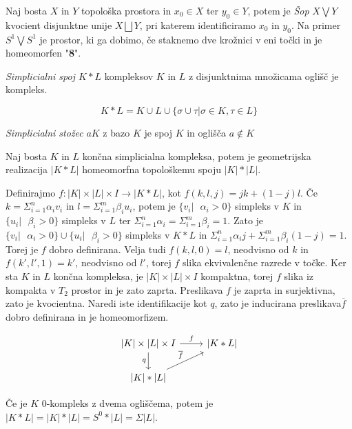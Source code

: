 \documentclass[mat1]{fmfdelo}
\begin{document}
Naj bosta $X$ in $Y$ topološka prostora in $x_0\in X$ ter $y_0\in Y$, potem je 
\textit{Šop} $X\bigvee Y$ kvocient disjunktne unije $X\bigsqcup Y$, pri
 katerem identificiramo $x_0$ in $y_0$. Na primer $S^1\bigvee S^1$ je prostor,
  ki ga dobimo, če staknemo dve krožnici v eni točki in je homeomorfen "\textbf{8}".


\textit{Simplicialni spoj $K\ast L$} kompleksov $K$ in $L$ z disjunktnima množicama oglišč je kompleks.

$$
K\ast L=K\cup L \cup \{\sigma \cup \tau| \sigma \in K, \tau \in L \}
$$

\textit{Simplicialni stožec} $aK$ z bazo $K$ je spoj $K$ in oglišča $a\notin K$


\begin{trditev}
    \label{tr:spoj}
    Naj bosta $K$ in $L$ končna simplicialna kompleksa, potem je geometrijska realizacija $|K\ast L|$ homeomorfna topološkemu spoju $|K|\ast |L|$.
\end{trditev}
\begin{dokaz}
Definirajmo $f:|K|\times |L|\times I\rightarrow |K\ast L|$, kot $f(k,l,j)=jk+(1-j)l$. Če $k=\Sigma_{i=1}^n \alpha_i v_i$ in $l=\Sigma_{i=1}^m \beta_i u_i$, potem je $\{v_i|\text{ $\alpha_i > 0$}\}$ simpleks v $K$ in $\{u_i|\text{ $\beta_i > 0$}\}$ simpleks v $L$ ter $\Sigma_{i=1}^n \alpha_i = \Sigma_{i=1}^m \beta_i=1$. Zato je $\{v_i|\text{ $\alpha_i > 0$}\}\cup \{u_i|\text{ $\beta_i > 0$}\}$ simpleks v $K\ast L$  in $\Sigma_{i=1}^n \alpha_i j + \Sigma_{i=1}^m \beta_i (1-j)=1$. Torej je $f$ dobro definirana. Velja tudi $f(k,l,0)=l$, neodvisno od $k$ in $f(k',l',1)=k'$, neodvisno od $l'$, torej $f$ slika ekvivalenčne razrede v točke. Ker sta $K$ in $L$ končna kompleksa, je $|K|\times |L|\times I$ kompaktna, torej $f$ slika iz kompakta v $T_2$ prostor in je zato zaprta. Preslikava $f$ je zaprta in surjektivna, zato je kvocientna. Naredi iste identifikacije kot $q$, zato je inducirana preslikava$\overline{f}$ dobro definirana in je homeomorfizem.

\[\begin{tikzcd}
    {|K|\times |L|\times I }\arrow{r}{f} \arrow[swap]{d}{q} & {|K\ast L|} \\
    {|K|\ast |L|} \arrow{ru}{\overline{f}}
   \end{tikzcd}
   \]


\end{dokaz}

Če je $K$ 0-kompleks z dvema ogliščema, potem je $|K\ast L|=|K|\ast |L|=S^0\ast |L| = \Sigma |L|$.
\end{document}
